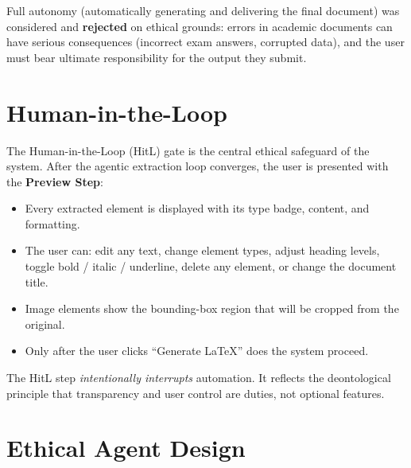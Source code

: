 \documentclass[12pt,a4paper]{article}
\begin{document}
Full autonomy (automatically generating and delivering the final document) was considered and
\textbf{rejected} on ethical grounds: errors in academic documents can have serious consequences
(incorrect exam answers, corrupted data), and the user must bear ultimate responsibility for the
output they submit.


\section{Human-in-the-Loop}
\label{sec:hitl}

The Human-in-the-Loop (HitL) gate is the central ethical safeguard of the system. After the
agentic extraction loop converges, the user is presented with the \textbf{Preview Step}:

\begin{itemize}[noitemsep]
  \item Every extracted element is displayed with its type badge, content, and formatting.
  \item The user can: edit any text, change element types, adjust heading levels, toggle bold /
    italic / underline, delete any element, or change the document title.
  \item Image elements show the bounding-box region that will be cropped from the original.
  \item Only after the user clicks ``Generate LaTeX'' does the system proceed.
\end{itemize}

The HitL step \emph{intentionally interrupts} automation. It reflects the
deontological principle that transparency and user control are duties, not optional features.


\section{Ethical Agent Design}
\end{document}

